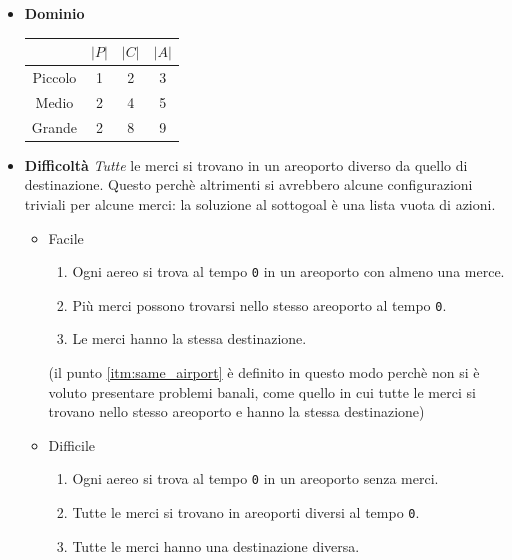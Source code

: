 \documentclass[a4paper,oneside,12pt]{book}
\begin{document}
    \begin{itemize}
        \item \textbf{Dominio}

        \begin{tabular}{|c | c| c |c |}
            \hline
            &$|P|$&$|C|$&$|A|$\\
            \hline
            Piccolo &1&2&3\\
            \hline
            Medio   &2&4&5\\
            \hline
            Grande  &2&8&9\\
            \hline
        \end{tabular}
        \item \textbf{Difficoltà}
        \textit{Tutte} le merci si trovano in un areoporto diverso da quello di destinazione.
        Questo perchè altrimenti si avrebbero alcune configurazioni triviali per alcune merci: la soluzione al
        sottogoal è una lista vuota di azioni.
        \begin{itemize}

            \item Facile
            \begin{enumerate}
                \item Ogni aereo si trova al tempo \texttt{0} in un areoporto con almeno una merce.
                \item Più merci possono trovarsi nello stesso areoporto al tempo \texttt{0}. \label{itm:same_airport}
                \item Le merci hanno la stessa destinazione.
            \end{enumerate}
            (il punto \ref{itm:same_airport} è definito in questo modo perchè non si è voluto presentare problemi
            banali, come quello in cui tutte le merci si trovano nello stesso areoporto e hanno la stessa destinazione)
            \item Difficile
            \begin{enumerate}
                \item Ogni aereo si trova al tempo \texttt{0} in un areoporto senza merci.
                \item Tutte le merci si trovano in areoporti diversi al tempo \texttt{0}.
                \item Tutte le merci hanno una destinazione diversa.
            \end{enumerate}
        \end{itemize}
    \end{itemize}
\end{document}
